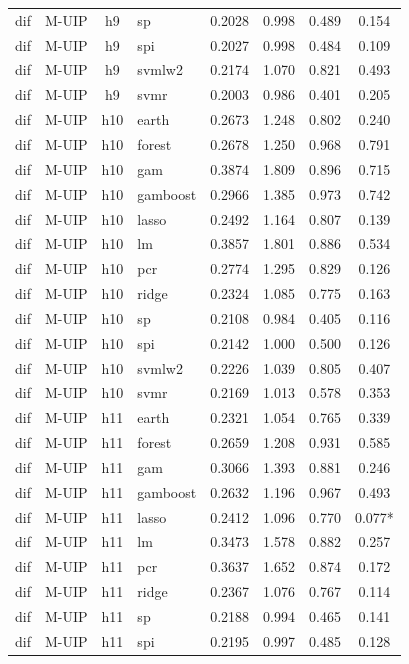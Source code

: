 \begin{ThreePartTable}
\begin{longtable}[t]{llclcccc}
dif & M-UIP & h9 & sp & 0.2028 & 0.998 & 0.489 & 0.154\\
dif & M-UIP & h9 & spi & 0.2027 & 0.998 & 0.484 & 0.109\\
dif & M-UIP & h9 & svmlw2 & 0.2174 & 1.070 & 0.821 & 0.493\\
dif & M-UIP & h9 & svmr & 0.2003 & 0.986 & 0.401 & 0.205\\
\addlinespace
dif & M-UIP & h10 & earth & 0.2673 & 1.248 & 0.802 & 0.240\\
dif & M-UIP & h10 & forest & 0.2678 & 1.250 & 0.968 & 0.791\\
dif & M-UIP & h10 & gam & 0.3874 & 1.809 & 0.896 & 0.715\\
dif & M-UIP & h10 & gamboost & 0.2966 & 1.385 & 0.973 & 0.742\\
dif & M-UIP & h10 & lasso & 0.2492 & 1.164 & 0.807 & 0.139\\
dif & M-UIP & h10 & lm & 0.3857 & 1.801 & 0.886 & 0.534\\
dif & M-UIP & h10 & pcr & 0.2774 & 1.295 & 0.829 & 0.126\\
dif & M-UIP & h10 & ridge & 0.2324 & 1.085 & 0.775 & 0.163\\
dif & M-UIP & h10 & sp & 0.2108 & 0.984 & 0.405 & 0.116\\
dif & M-UIP & h10 & spi & 0.2142 & 1.000 & 0.500 & 0.126\\
dif & M-UIP & h10 & svmlw2 & 0.2226 & 1.039 & 0.805 & 0.407\\
dif & M-UIP & h10 & svmr & 0.2169 & 1.013 & 0.578 & 0.353\\
\addlinespace
dif & M-UIP & h11 & earth & 0.2321 & 1.054 & 0.765 & 0.339\\
dif & M-UIP & h11 & forest & 0.2659 & 1.208 & 0.931 & 0.585\\
dif & M-UIP & h11 & gam & 0.3066 & 1.393 & 0.881 & 0.246\\
dif & M-UIP & h11 & gamboost & 0.2632 & 1.196 & 0.967 & 0.493\\
dif & M-UIP & h11 & lasso & 0.2412 & 1.096 & 0.770 & 0.077*\\
dif & M-UIP & h11 & lm & 0.3473 & 1.578 & 0.882 & 0.257\\
dif & M-UIP & h11 & pcr & 0.3637 & 1.652 & 0.874 & 0.172\\
dif & M-UIP & h11 & ridge & 0.2367 & 1.076 & 0.767 & 0.114\\
dif & M-UIP & h11 & sp & 0.2188 & 0.994 & 0.465 & 0.141\\
dif & M-UIP & h11 & spi & 0.2195 & 0.997 & 0.485 & 0.128\\

\end{longtable}
\end{ThreePartTable}
